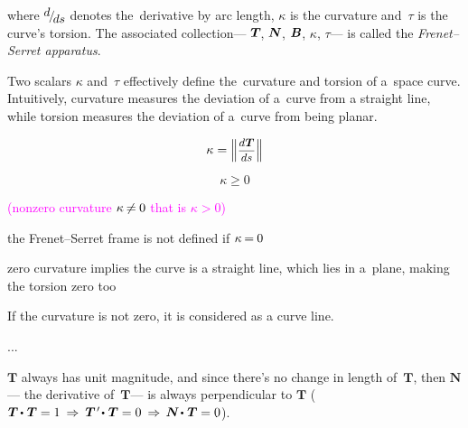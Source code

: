 \begin{otherlanguage}{russian}
\vspace{-0.2em}\noindent
where ${\scalebox{.93}{$ \raisemath{.3em}{d} \hspace{-0.25ex} / \hspace{-0.33ex} \raisemath{-0.25em}{ds} $}}$ denotes the~derivative by arc length, $\kappa$ is the curvature and~$\tau$ is the curve’s torsion.
The associated collection\:--- ${\bm{T}\hspace{-0.2ex}}$, ${\bm{N}\hspace{-0.2ex}}$, ${\bm{B}\hspace{-0.1ex}}$, $\kappa$, $\tau$\:--- is called the \emph{Frenet--Serret apparatus}.

Two scalars $\kappa$ and~$\tau$ effectively define the~curvature and torsion of a~space curve.
Intuitively, curvature measures the deviation of a~curve from a straight line, while torsion measures the deviation of a~curve from being planar.

\[
\displaystyle \kappa = \left\| \scalebox{.88}{$ \displaystyle\frac{ d\hspace{.1ex}\bm{T} }{ds} $} \right\|
\]

\[
\kappa \ge 0
\]

\textcolor{magenta}{(nonzero curvature ${\kappa \hspace{-0.2ex} \neq \hspace{-0.1ex} 0}$ that is ${\kappa > 0}$)}

the Frenet--Serret frame is not defined if ${\kappa \hspace{-0.2ex} = \hspace{-0.1ex} 0}$

zero curvature implies the curve is a straight line, which lies in a~plane, making the torsion zero too

If the curvature is not zero, it is considered as a curve line.

...

$\bm{T}$ always has unit magnitude, and since there’s no change in length of~$\bm{T}$, then $\bm{N}$\:--- the derivative of~$\bm{T}$\:--- is always perpendicular to $\bm{T}$
(${\bm{T} \hspace{-0.15ex} \dotp \hspace{.1ex} \bm{T} = 1
\hspace{.22em} \Rightarrow \hspace{.22em}
\bm{T}{\hspace{.25ex}'} \hspace{-0.3ex} \dotp \hspace{.1ex} \bm{T} = 0
\hspace{.22em} \Rightarrow \hspace{.16em}
\bm{N} \hspace{-0.3ex} \dotp \hspace{.1ex} \bm{T} = 0}$).


\end{otherlanguage}
